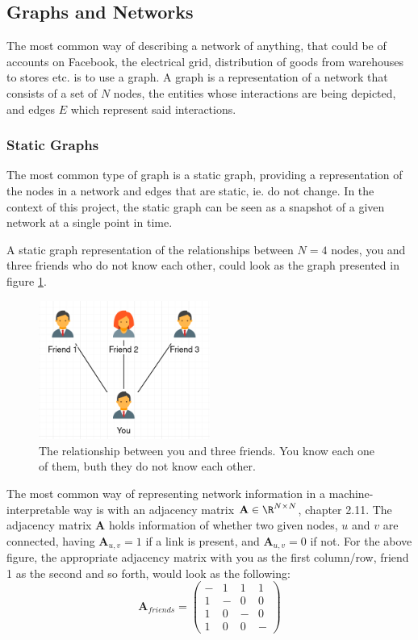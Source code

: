 \subsection{Graphs and Networks}
\label{sec:Method:Graphs}
The most common way of describing a network of anything, that could be of accounts on Facebook, the electrical grid, distribution of goods from warehouses to stores etc. is to use a graph.
A graph is a representation of a network that consists of a set of $N$ nodes, the entities whose interactions are being depicted, and edges $E$ which represent said interactions.


\subsubsection{Static Graphs}
\label{sec:Method:Graphs:StaticGraphs}
The most common type of graph is a static graph, providing a representation of the nodes in a network and edges that are static, ie. do not change. 
In the context of this project, the static graph can be seen as a snapshot of a given network at a single point in time.

A static graph representation of the relationships between $N=4$ nodes, you and three friends who do not know each other, could look as the graph presented in figure \ref{fig:StaticGraph}.

\begin{figure}[H]
    \centering
    \includegraphics[width=0.5\textwidth]{0_images/static_graph.png}
    \caption{The relationship between you and three friends. You know each one of them, buth they do not know each other.}
    \label{fig:StaticGraph}
\end{figure}
The most common way of representing network information in a machine-interpretable way is with an adjacency matrix $\textbf{A} \in \R^{N \times N}$, \cite{NetworkBarabasi} chapter 2.11.
The adjacency matrix $\textbf{A}$ holds information of whether two given nodes, $u$ and $v$ are connected, having $\textbf{A}_{u,v} = 1$ if a link is present, and $\textbf{A}_{u,v} = 0$ if not.
For the above figure, the appropriate adjacency matrix  with you as the first column/row, friend 1 as the second and so forth, would look as the following:
\begin{equation}
    \textbf{A}_{friends} = \begin{pmatrix}
                - & 1 & 1 & 1\\
                1 & - & 0 & 0\\
                1 & 0 & - & 0\\
                1 & 0 & 0 & -
                \end{pmatrix}
\end{equation}

